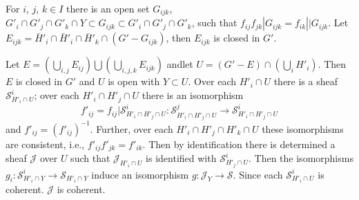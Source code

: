 For $i$, $j$, $k \in I$ there is an open set $G_{ijk}$, $G'_i \cap
G'_j \cap G'_k \cap Y \subset G_{ijk} \subset G'_i \cap G'_j \cap
 G'_k$, such that $f_{ij} f_{jk}| G_{ijk} = f_{ik}| \big|
 G_{ijk}$. Let $E_{ijk} = \bar{H}'_i \cap \bar{H}'_i \cap \bar{H}'_k
 \cap (G' - G_{ijk})$, then $E_{ijk}$ is closed in $G'$.  

Let $E = (\bigcup_{i,j} E_{ij}) \bigcup (\bigcup_{i,j,k} E_{i j k})$
and\pageoriginale let $U = (G' - E) \cap(\bigcup_i H'_i)$. Then $E$ is
closed in 
$G'$ and $U$ is open with $Y \subset U$. Over each $H'_i \cap U$ there
is a sheaf $\mathscr{S}^{i}_{H'_i \cap U}$; over each $H'_i \cap H'_j
\cap U$ there is an isomorphism  
$$
f'_{ij} = f_{ij} \Bigg| \mathscr{S}^{i}_{H'_i \cap H'_j \cap U}:
\mathscr{S}^{j}_{H'_i \cap H'_j \cap U} \to \mathscr{S}^{i}_{H'_i \cap
  H'_j \cap U}  
$$
and $f'_{ij} = (f'_{ij})^{-1}$. Further, over each $H'_i \cap H'_j \cap
H'_k \cap U$ these isomorphisms are consistent, i.e., $f'_{ij} f'_{jk}
= f'_{ik}$. Then by identification there is determined a sheaf
$\mathcal{J}$ over $U$ such that $\mathcal{J}_{H'_i \cap U}$ is
identified with $\mathscr{S}^i_{H'_j \cap U}$. Then the isomorphisms
$g_i: \mathscr{S}^i_{H'_i \cap Y} \to \mathscr{S}_{H'_i \cap Y}$
induce an isomorphism $ g: \mathcal{J}_Y \to \mathscr{S}$. Since  each
$\mathscr{S}^i_{H'_i \cap U}$ is coherent. $\mathcal{J}$ is
coherent.
 

